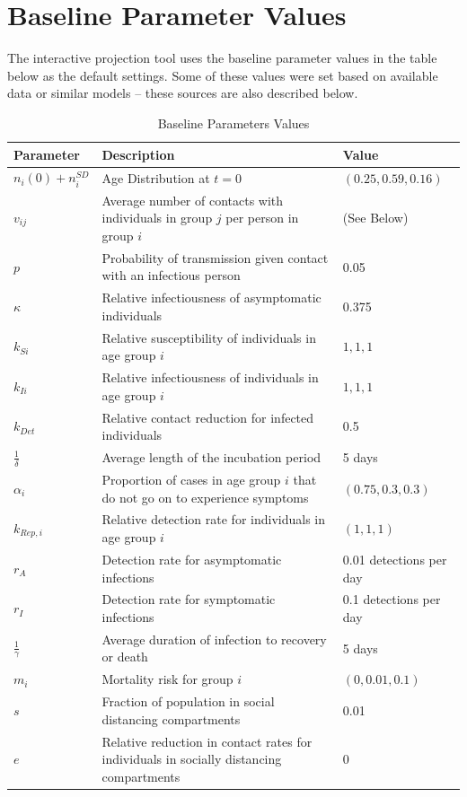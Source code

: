\documentclass[12pt]{article}
\begin{document}
\section{Baseline Parameter Values}

The interactive projection tool uses the baseline parameter values in the table below as the default settings. Some of these values were set based on available data or similar models -- these sources are also described below.

\begin{table}[H]
\begin{tabular}{p{}  p{} p{}}
\textbf{Parameter}             & \textbf{Description} & \textbf{Value}  \\\hline
\(n_i(0)+n_{i}^{SD}\) & Age Distribution at \(t=0\) & \((0.25, 0.59, 0.16)\)\\
\(v_{ij}\) & Average number of contacts with individuals in group \(j\) per person in group \(i\) &  (See Below)\\
\(p\) & Probability of transmission given contact with an infectious person & 0.05 \\
\(\kappa\)& Relative infectiousness of asymptomatic individuals & 0.375 \\
\(k_{Si}\) & Relative susceptibility of individuals in age group \(i\) & \(1,1,1\) \\
\(k_{Ii}\) & Relative infectiousness of individuals in age group \(i\) & \(1,1,1\) \\
\(k_{Det}\) & Relative contact reduction for infected individuals & 0.5 \\
\(\frac{1}{\delta}\) & Average length of the incubation period    & 5 days \\
\(\alpha_i\) & Proportion of cases in age group \(i\) that do not go on to experience symptoms & \((0.75, 0.3, 0.3)\) \\
\(k_{Rep,i}\) & Relative detection rate for individuals in age group \(i\) & \((1,1,1)\)\\
\(r_A\) & Detection rate for asymptomatic infections & 0.01 detections per day\\
\(r_I\) & Detection rate for symptomatic infections & 0.1 detections per day\\
\(\frac{1}{\gamma}\) & Average duration of infection to recovery or death &  5 days\\
\(m_i\) & Mortality risk for group \(i\) & \((0, 0.01, 0.1)\) \\
\(s\) & Fraction of population in social distancing compartments & 0.01 \\
\(e\) & Relative reduction in contact rates for individuals in socially distancing compartments & 0 \\\hline
\end{tabular}
\caption{Baseline Parameters Values}
\end{table}
\end{document}
